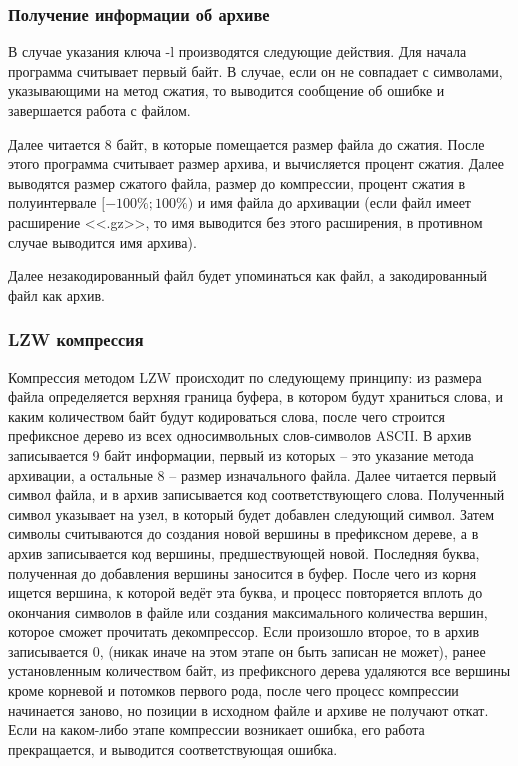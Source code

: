 \documentclass[12pt]{article}
\begin{document}
	\subsubsection*{Получение информации об архиве}
	
	В случае указания ключа -l производятся следующие действия. Для начала программа считывает первый байт. В случае, если он не совпадает с символами, указывающими на метод сжатия, то выводится сообщение об ошибке и завершается работа с файлом. 
	
	Далее читается 8 байт, в которые помещается размер файла до сжатия. После этого программа считывает размер архива, и вычисляется процент сжатия. Далее выводятся размер сжатого файла, размер до компрессии, процент сжатия в полуинтервале $[-100\%; 100\%)$ и имя файла до архивации (если файл имеет расширение <<.gz>>, то имя выводится без этого расширения, в противном случае выводится имя архива).
	
	Далее незакодированный файл будет упоминаться как файл, а закодированный файл как архив.
	
	\subsubsection*{LZW компрессия}
	
	Компрессия методом LZW происходит по следующему принципу: из размера файла определяется верхняя граница буфера, в котором будут храниться слова, и каким количеством байт будут кодироваться слова, после чего строится префиксное дерево из всех односимвольных слов-символов ASCII. В архив записывается 9 байт информации, первый из которых -- это указание метода архивации, а остальные 8 -- размер изначального файла. Далее читается первый символ файла, и в архив записывается код соответствующего слова. Полученный символ указывает на узел, в который будет добавлен следующий символ. Затем символы считываются до создания новой вершины в префиксном дереве, а в архив записывается код вершины, предшествующей новой. Последняя буква, полученная до добавления вершины заносится в буфер. После чего из корня ищется вершина, к которой ведёт эта буква, и процесс повторяется вплоть до окончания символов в файле или создания максимального количества вершин, которое сможет прочитать декомпрессор. Если произошло второе, то в архив записывается $0$, (никак иначе на этом этапе он быть записан не может), ранее установленным количеством байт, из префиксного дерева удаляются все вершины кроме корневой и потомков первого рода, после чего процесс компрессии начинается заново, но позиции в исходном файле и архиве не получают откат. Если на каком-либо этапе компрессии возникает ошибка, его работа прекращается, и выводится соответствующая ошибка.
	
\end{document}
